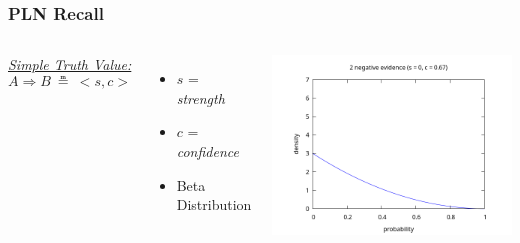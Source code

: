 \documentclass[aspectratio=169]{beamer}
\newcommand{\limp}{\Rightarrow}
\newcommand{\STV}[2]{<\!#1, #2\!>}
\begin{document}
\begin{frame}
  \frametitle{PLN Recall}
  \begin{columns}
    \column{5cm}
    \underline{\emph{Simple Truth Value:}}
    $$A \limp B\ \measeq\ \STV{s}{c}$$
    \begin{itemize}
    \item $s$ = \emph{strength}
    \item $c$ = \emph{confidence}
    \item Beta Distribution
    \end{itemize}
    \column{10cm}
    \includegraphics[scale=0.4]{figs/observations_2_0.png}
  \end{columns}
\end{frame}
\end{document}
